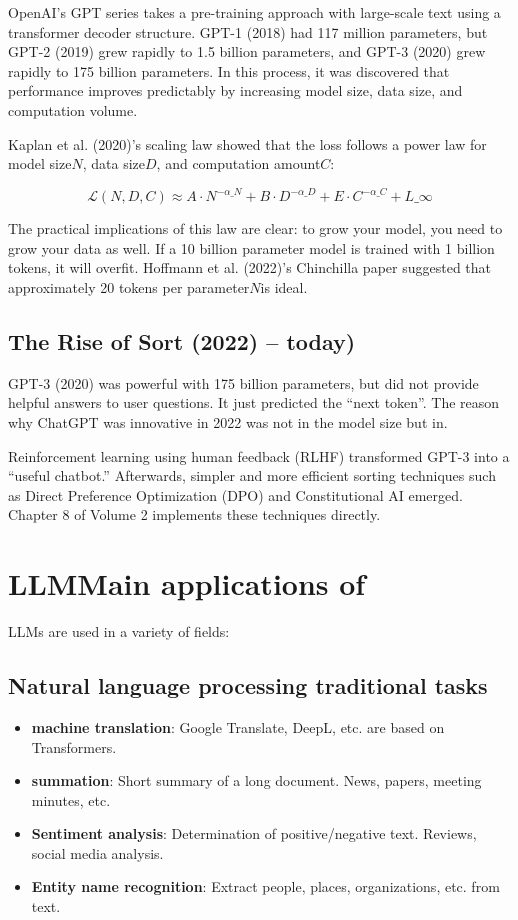 OpenAI's GPT series takes a pre-training approach with large-scale text using a transformer decoder structure. GPT-1 (2018) had 117 million parameters, but GPT-2 (2019) grew rapidly to 1.5 billion parameters, and GPT-3 (2020) grew rapidly to 175 billion parameters. In this process, it was discovered that performance improves predictably by increasing model size, data size, and computation volume.

Kaplan et al. (2020)'s scaling law showed that the loss follows a power law for model size$N$, data size$D$, and computation amount$C$:

\[
\mathcal{L}(N, D, C) \approx A \cdot N^{-\alpha\_N} + B \cdot D^{-\alpha\_D} + E \cdot C^{-\alpha\_C} + L\_\infty
\]

The practical implications of this law are clear: to grow your model, you need to grow your data as well. If a 10 billion parameter model is trained with 1 billion tokens, it will overfit. Hoffmann et al. (2022)'s Chinchilla paper suggested that approximately 20 tokens per parameter$N$is ideal.

\subsection{The Rise of Sort (2022)  --  today)}

GPT-3 (2020) was powerful with 175 billion parameters, but did not provide helpful answers to user questions. It just predicted the ``next token''. The reason why ChatGPT was innovative in 2022 was not in the model size but in.

Reinforcement learning using human feedback (RLHF) transformed GPT-3 into a ``useful chatbot.'' Afterwards, simpler and more efficient sorting techniques such as Direct Preference Optimization (DPO) and Constitutional AI emerged. Chapter 8 of Volume 2 implements these techniques directly.

\section{LLMMain applications of}

LLMs are used in a variety of fields:

\subsection{Natural language processing traditional tasks}
\begin{itemize}
\item\textbf{machine translation}: Google Translate, DeepL, etc. are based on Transformers.
\item\textbf{summation}: Short summary of a long document. News, papers, meeting minutes, etc.
\item\textbf{Sentiment analysis}: Determination of positive/negative text. Reviews, social media analysis.
\item\textbf{Entity name recognition}: Extract people, places, organizations, etc. from text.
\end{itemize}

